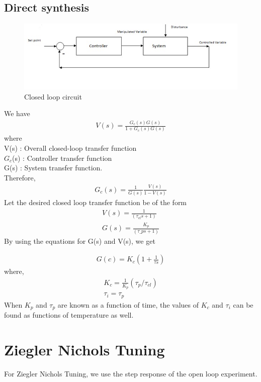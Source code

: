 \subsection{Direct synthesis}

\begin{figure}[h]
	\centering
		\includegraphics[scale = 20,width = 1\linewidth]{Vikas_self/report_tex/Closed Loop Circuit.jpg}
	\caption{Closed loop circuit}
\end{figure}
We have
\begin{align}
V(s) = \frac {G_c(s) G(s)}{1+G_c(s) G(s)}
\end{align}
where\\
V(s) : Overall closed-loop transfer function\\
$G_c$(s) : Controller transfer function\\
G(s) : System transfer function.\\
Therefore,
\begin{align}
G_c(s) = \frac 1{G(s)} \frac {V(s)}{1-V(s)}
\end{align}
Let the desired closed loop transfer function be of the form
\begin{align}
V(s)=\frac 1{(\tau_{cl}s+1)}\\
G(s)=\frac {K_p}{(\tau\_p s+1)}
\end{align}
By using the equations for G(s) and V(s), we get

\begin{align}
G(c)=K_c(1 + \frac {1}{\tau s})
\end{align}
where,\\
\begin{align}
K_c = \frac 1{K_p} (\tau_p / \tau_{cl} )\\
\tau_i = \tau_p
\end{align}
When $K_p$ and $\tau_p$ are known as a function of time, the values of $K_c$ and $\tau_i$ can be found as functions of 
temperature as well.
\newpage
\section{Ziegler Nichols Tuning}
For Ziegler Nichols Tuning, we use the step response of the open loop experiment.

